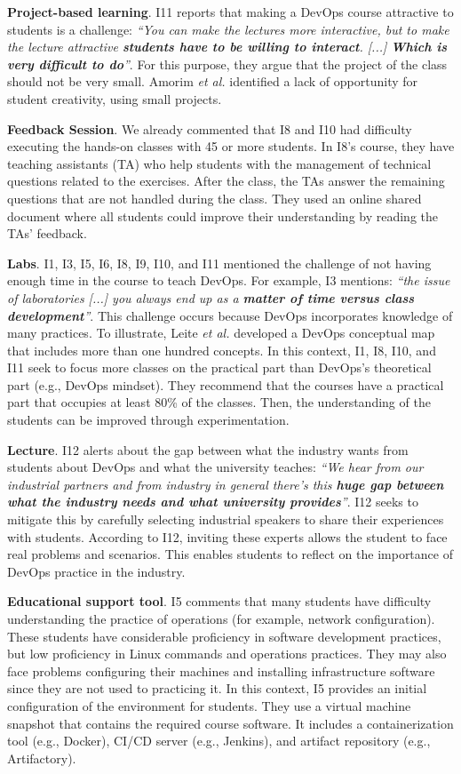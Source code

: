 \documentclass[10pt,conference]{IEEEtran}
\begin{document}
\textbf{Project-based learning}. I11 reports that making a DevOps course attractive to students is a challenge: \textit{``You can make the lectures more interactive, but to make the lecture attractive 
\textbf{students have to be willing to interact}. [...] \textbf{Which is very difficult to do}''}. For this purpose, they argue that the project of the class should not be very small. Amorim \textit{et al.} \cite{amorim:2020} identified a lack of opportunity for student creativity, using small projects.

\textbf{Feedback Session}. We already commented that I8 and I10 had difficulty executing the hands-on classes with 45 or more students. In I8’s course, they have teaching assistants (TA) who help students with the management of technical questions related to the exercises. After the class, the TAs answer the remaining questions that are not handled during the class. They used an online shared document where all students could improve their understanding by reading the TAs' feedback. 

\textbf{Labs}. I1, I3, I5, I6, I8, I9, I10, and I11 mentioned the challenge of not having enough time in the course to teach DevOps. For example, I3 mentions: \textit{``the issue of laboratories [...] you always end up as a \textbf{matter of time versus class development}''}. This challenge occurs because DevOps incorporates knowledge of many practices. To illustrate, Leite \textit{et al.} \cite{leite:2019} developed a DevOps conceptual map that includes more than one hundred concepts. In this context, I1, I8, I10, and I11 seek to focus more classes on the practical part than DevOps’s theoretical part (e.g., DevOps mindset). They recommend that the courses have a practical part that occupies at least 80\% of the classes. Then, the understanding of the students can be improved through experimentation.  


\textbf{Lecture}. I12 alerts about the gap between what the industry wants from students about DevOps and what the university teaches: \textit{``We hear from our industrial partners and from industry in general there's this \textbf{huge gap between what the industry needs and what university provides}''}. I12 seeks to mitigate this by carefully selecting industrial speakers to share their experiences with students. According to I12, inviting these experts allows the student to face real problems and scenarios. This enables students to reflect on the importance of DevOps practice in the industry.


\textbf{Educational support tool}. I5 comments that many students have difficulty understanding the practice of operations (for example, network configuration). These students have considerable proficiency in software development practices, but low proficiency in Linux commands and operations practices. They may also face problems configuring their machines and installing infrastructure software since they are not used to practicing it. In this context, I5 provides an initial configuration of the environment for students. They use a virtual machine snapshot that contains the required course software. It includes a containerization tool (e.g., Docker), CI/CD server (e.g., Jenkins), and artifact repository (e.g., Artifactory).
\end{document}
